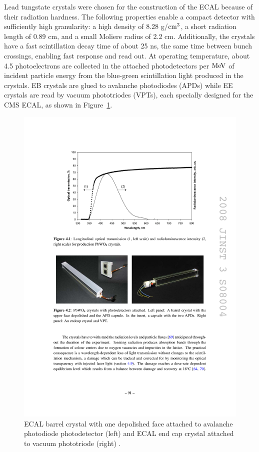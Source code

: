\indent Lead tungstate crystals were chosen for the construction of the ECAL because of their radiation hardness. The following properties enable a compact detector with sufficiently high granularity: a high density of 8.28 g/$\rm{cm}^3$, a short radiation length of 0.89 cm, and a small Moliere radius of 2.2 cm. Additionally, the crystals have a fast scintillation decay time of about 25 ns, the same time between bunch crossings, enabling fast response and read out. At operating temperature, about 4.5 photoelectrons are collected in the attached photodetectors per $\mathrm{Me\kern -0.1em V}$ of incident particle energy from the blue-green scintillation light produced in the crystals. EB crystals are glued to avalanche photodiodes (APDs) while EE crystals are read by vacuum phototriodes (VPTs), each specially designed for the CMS ECAL, as shown in Figure~\ref{fig:crystalmodules}. 

\begin{figure}[tbh]
\centering
\includegraphics[width=6in]{figures/crystalmodules.pdf}
\caption{ECAL barrel crystal with one depolished face attached to avalanche photodiode photodetector (left) and ECAL end cap crystal attached to vacuum phototriode (right) \cite{1748-0221-3-08-S08004}.}
\label{fig:crystalmodules}
\end{figure}

